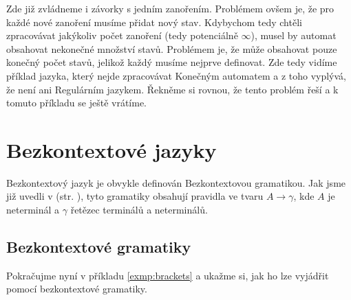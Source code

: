\begin{exmp}
  Zde již zvládneme i závorky s jedním zanořením. Problémem ovšem je, že
  pro každé nové zanoření musíme přidat nový stav.
  Kdybychom tedy chtěli zpracovávat jakýkoliv počet zanoření (tedy potenciálně $\infty$),
  musel by automat obsahovat nekonečné množství stavů.
  Problémem  je, že může obsahovat pouze konečný
  počet stavů, jelikož každý musíme nejprve definovat.
  Zde tedy vidíme příklad jazyka, který nejde zpracovávat Konečným automatem
  a z toho vyplývá, že není ani Regulárním jazykem.
  Řekněme si rovnou, že  tento problém řeší a k tomuto
  příkladu se ještě vrátíme.

\end{exmp}

\section{Bezkontextové jazyky}

Bezkontextový jazyk je obvykle definován Bezkontextovou gramatikou.
Jak jsme již uvedli v  (str. \pageref{subsec:chomHierarchy}),
tyto gramatiky obsahují pravidla ve tvaru $A \rightarrow \gamma$, kde $A$ je neterminál a
$\gamma$ řetězec terminálů a neterminálů.

\subsection{Bezkontextové gramatiky}
\label{subsec:contextFreeGrammars}
Pokračujme nyní v příkladu \ref{exmp:brackets} a ukažme si, jak ho lze
vyjádřit pomocí bezkontextové gramatiky.\\

